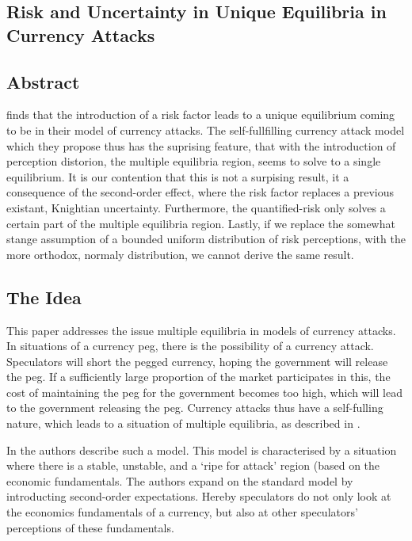 \begin{refsection}

\chapter{Risk and Uncertainty in Unique Equilibria in Currency Attacks}
\label{unc}
\section*{Abstract}
\textcite{morris1998unique} finds that the introduction of a risk factor leads to a unique equilibrium coming to be in their model of currency attacks.
The self-fullfilling currency attack model which they propose thus has the suprising feature,
that with the introduction of perception distorion, the multiple equilibria region, seems to solve to a single equilibrium.
It is our contention that this is not a surpising result, 
it a consequence of the second-order effect, where the risk factor replaces a previous existant, Knightian uncertainty.
Furthermore, the quantified-risk only solves a certain part of the multiple equilibria region.
Lastly, if we replace the somewhat stange assumption of a bounded uniform distribution of risk perceptions,
with the more orthodox, normaly distribution, we cannot derive the same result.

\section{The Idea}
\label{unc:idea}
This paper addresses the issue multiple equilibria in models of currency attacks.
In situations of a currency peg, there is the possibility of a currency attack.
Speculators will short the pegged currency, hoping the government will release the peg.
If a sufficiently large proportion of the market participates in this,
the cost of maintaining the peg for the government becomes too high,
which will lead to the government releasing the peg.
Currency attacks thus have a self-fulling nature,
which leads to a situation of multiple equilibria,
as described in \textcite{obstfeld1986rational,obstfeld1995logic,obstfeld1996models}.

In \textcite{morris1998unique} the authors describe such a model.
This model is characterised by a situation where there is a stable, unstable,
and a `ripe for attack' region (based on the economic fundamentals.
The authors expand on the standard model by introducting second-order expectations.
Hereby speculators do not only look at the economics fundamentals of a currency,
but also at other speculators' perceptions of these fundamentals.


\end{refsection}
